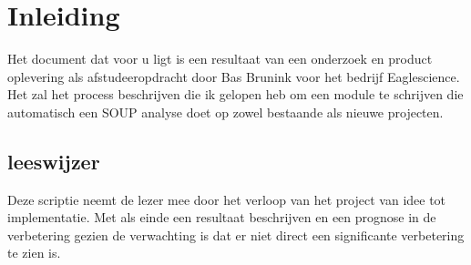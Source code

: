 \chapter{Inleiding} %

\label{ch:Inleiding} %
Het document dat voor u ligt is een resultaat van een onderzoek en product oplevering als afstudeeropdracht door Bas Brunink voor het bedrijf Eaglescience. Het zal het process beschrijven die ik gelopen heb om een module te schrijven die automatisch een SOUP analyse doet op zowel bestaande als nieuwe projecten. 

\section{leeswijzer}
Deze scriptie neemt de lezer mee door het verloop van het project van idee tot implementatie. Met als einde een resultaat beschrijven en een prognose in de verbetering gezien de verwachting is dat er niet direct een significante verbetering te zien is. 